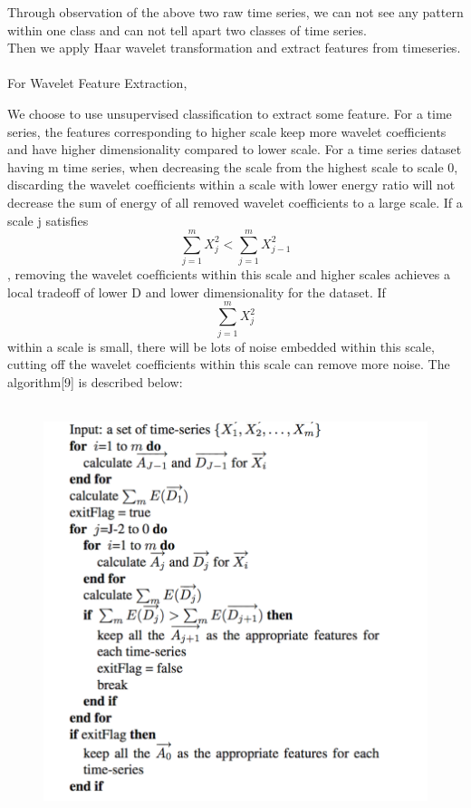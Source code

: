 \begin{enumerate}
Through observation of the above two raw time series, we can not see any pattern within one class and can not tell apart two classes of time series.\\
Then we apply Haar wavelet transformation and extract features from timeseries.\\\\
For Wavelet Feature Extraction, 

We choose to use unsupervised classification to extract some feature.
For a time series, the features corresponding to higher scale keep more wavelet coefficients and have higher dimensionality compared to lower scale.
For a time series dataset having m time series,
when decreasing the scale from the highest scale to scale 0, discarding the wavelet coefﬁcients within a scale with lower energy ratio will not decrease the sum of energy of all removed wavelet coefficients to a large scale. If a scale j satisfies 
$$\sum_{j=1}^{m}X_j^{2} < \sum_{j=1}^{m}X_{j-1}^{2}$$, removing the wavelet coefﬁcients within this scale and higher scales achieves a local tradeoff of lower D and lower dimensionality for the dataset. If $$\sum_{j=1}^{m}X_j^{2}$$ within a scale is small, there will be lots of noise embedded within this scale, cutting off the wavelet coefficients within this scale can remove more noise. The algorithm[9] is described below:\\\\

\begin{figure}[H]

\includegraphics[scale=.7]{PIC/alg_feature_extraction.png}
\end{figure}


\end{enumerate}
